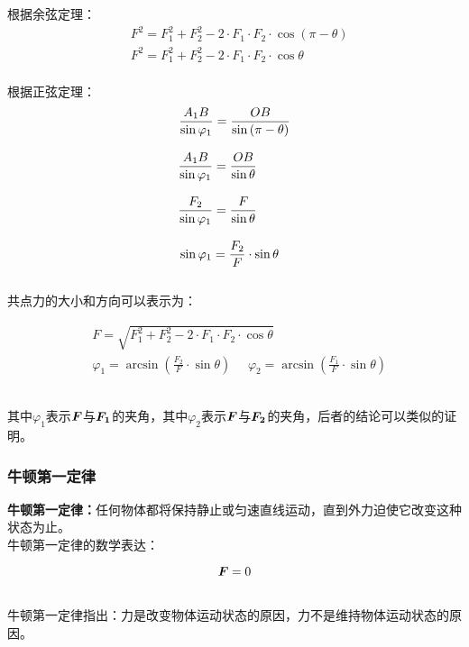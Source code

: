 \documentclass[UTF8]{ctexart}
\newcommand*{\veb}[1]{\vb*{#1}}
\begin{document}
    根据余弦定理：
    \begin{align}
        &F^2=F_1^2+F_2^2-2\cdot F_1\cdot F_2\cdot\cos{(\pi-\theta)}\\[3mm]
        &F^2=F_1^2+F_2^2-2\cdot F_1\cdot F_2\cdot\cos{\theta}
    \end{align}\\
    根据正弦定理：
    \begin{align}
        &\hspace{0.5pt}\frac{A_1B}{\sin{\varphi_1}}=\frac{OB}{\sin{(\pi-\theta)}}\\[3mm]
        &\frac{A_1B}{\sin{\varphi_1}}=\frac{OB}{\sin{\theta}}\\[3mm]
        &\frac{F_2}{\sin{\varphi_1}}=\frac{F}{\sin{\theta}}\\[3mm]
        &\sin{\varphi_1}=\frac{F_2}{F}\cdot\sin{\theta}
    \end{align}\\
    共点力的大小和方向可以表示为：\vspace{5pt}
    \begin{large}
        \begin{align*}
            &F=\sqrt{F_1^2+F_2^2-2\cdot F_1\cdot F_2\cdot\cos{\theta}}\\[3mm]
            &\varphi_1=\arcsin{\left(\frac{F_2}{F}\cdot\sin{\theta}\right)}~~~~~~
            \varphi_2=\arcsin{\left(\frac{F_1}{F}\cdot\sin{\theta}\right)}
        \end{align*}
    \end{large}\\
    其中$\varphi_1$表示$\veb{F}$与$\veb{F_1}$的夹角，其中$\varphi_2$表示$\veb{F}$与$\veb{F_2}$的夹角，后者的结论可以类似的证明。

\newpage

\subsubsection{牛顿第一定律}
    \textbf{牛顿第一定律：}任何物体都将保持静止或匀速直线运动，直到外力迫使它改变这种状态为止。\\[3mm]
    牛顿第一定律的数学表达：
    \begin{large}
        \begin{equation*}
            \veb{F}=0
        \end{equation*}
    \end{large}\\
    牛顿第一定律指出：力是改变物体运动状态的原因，力不是维持物体运动状态的原因。
\end{document}

